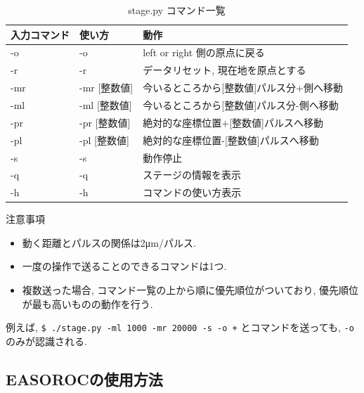 \begin{table}[H]
  \begin{center}
    \caption{stage.py コマンド一覧}
    \begin{tabular}{|l|l|l|} \hline
      入力コマンド & 使い方       & 動作                                      \\ \hline \hline
      -o           & -o           & left or right 側の原点に戻る              \\ \hline
      -r           & -r           & データリセット, 現在地を原点とする        \\ \hline
      -mr          & -mr [整数値] & 今いるところから[整数値]パルス分+側へ移動 \\ \hline
      -ml          & -ml [整数値] & 今いるところから[整数値]パルス分-側へ移動 \\ \hline
      -pr          & -pr [整数値] & 絶対的な座標位置+[整数値]パルスへ移動     \\ \hline
      -pl          & -pl [整数値] & 絶対的な座標位置-[整数値]パルスへ移動     \\ \hline
      -s           & -s           & 動作停止                                  \\ \hline
      -q           & -q           & ステージの情報を表示                      \\ \hline
      -h           & -h           & コマンドの使い方表示                      \\ \hline
    \end{tabular}
  \end{center}
\end{table}

\begin{itembox}[l]{注意事項}
  \begin{itemize}
    \item 動く距離とパルスの関係は2μm/パルス.
    \item 一度の操作で送ることのできるコマンドは1つ.
    \item 複数送った場合, コマンド一覧の上から順に優先順位がついており, 優先順位が最も高いものの動作を行う.
  \end{itemize}
  例えば, {\tt \$ ./stage.py -ml 1000 -mr 20000 -s -o +} とコマンドを送っても, {\tt -o} のみが認識される.
\end{itembox}


\subsection{EASOROCの使用方法}

